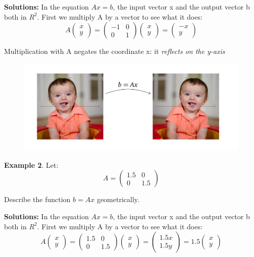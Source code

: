 \documentclass[a4paper,12pt]{article}
\begin{document}
\textbf{Solutions:} In the equation \(Ax=b\), the input vector x and the output vector b both in \(R^2\). First we multiply A by a vector to see what it does:
\[
    A
     \left( \begin{array}{c}
    x\\
    y
    \end{array} \right) 
    = 
    \left( \begin{array}{cc}
    -1 & 0\\
    0 & 1
    \end{array} \right)
    \left( \begin{array}{c}
    x\\
    y
    \end{array} \right)
    =
    \left( \begin{array}{c}
    -x\\
    y
    \end{array} \right)
\]

Multiplication with A negates the coordinate x: it \textit{ reflects on the y-axis}
\begin{figure}[H]
    \centering
    \includegraphics[width=0.75\linewidth]{reflect-Y.png}
    \label{fig:enter-label}
\end{figure}
\textbf{Example 2}. Let:
\[
    A = 
    \left( \begin{array}{cc}
    1.5 & 0\\
    0 & 1.5
    \end{array} \right)
\]

Describe the function \(b=Ax\) geometrically.

\textbf{Solutions:} In the equation \(Ax=b\), the input vector x and the output vector b both in \(R^2\). First we multiply A by a vector to see what it does:
\[
    A
     \left( \begin{array}{c}
    x\\
    y
    \end{array} \right) 
    = 
    \left( \begin{array}{cc}
    1.5 & 0\\
    0 & 1.5
    \end{array} \right)
    \left( \begin{array}{c}
    x\\
    y
    \end{array} \right)
    =
    \left( \begin{array}{c}
    1.5x\\
    1.5y
    \end{array} \right)
    =
    1.5
    \left( \begin{array}{c}
    x\\
    y
    \end{array} \right)
\]
\end{document}
